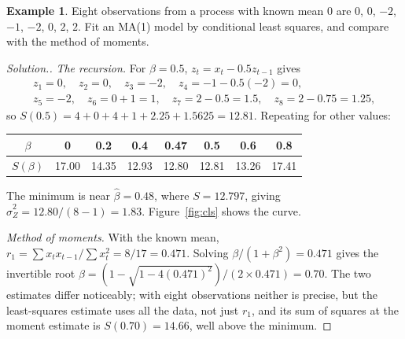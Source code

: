 \documentclass[11pt,a4paper]{article}
\theoremstyle{definition}
\newtheorem{exa}[thm]{Example}
\newenvironment{solution}
  {\renewcommand{\qedsymbol}{}\begin{proof}[\textit{Solution}.]}
  {\end{proof}}
\begin{document}
\begin{exa}\label{exa:fit-ma1}
Eight observations from a process with known mean $0$ are $0$, $0$, $-2$, $-1$, $-2$, $0$, $2$, $2$. Fit an MA(1) model by conditional least
squares, and compare with the method of moments.
\end{exa}

\begin{solution}
\emph{The recursion.} For $\beta = 0.5$, $z_t = x_t - 0.5z_{t-1}$ gives
\begin{gather*}
z_1 = 0 , \quad z_2 = 0 , \quad z_3 = -2 , \quad z_4 = -1 - 0.5(-2) = 0 , \\
z_5 = -2 , \quad z_6 = 0 + 1 = 1 , \quad z_7 = 2 - 0.5 = 1.5 , \quad z_8 = 2 - 0.75 = 1.25 ,
\end{gather*}
so $S(0.5) = 4 + 0 + 4 + 1 + 2.25 + 1.5625 = 12.81$. Repeating for other values:
\begin{center}
\begin{tabular}{c|ccccccc}
$\beta$ & 0 & 0.2 & 0.4 & 0.47 & 0.5 & 0.6 & 0.8 \\
\hline
$S(\beta)$ & 17.00 & 14.35 & 12.93 & 12.80 & 12.81 & 13.26 & 17.41 \\
\end{tabular}
\end{center}
The minimum is near $\hat\beta = 0.48$, where $S = 12.797$, giving $\hat\sigma_Z^2 = 12.80/(8 - 1) = 1.83$. Figure~\ref{fig:cls} shows the curve.

\emph{Method of moments.} With the known mean, $r_1 = \sum x_tx_{t-1}/\sum x_t^2 = 8/17 = 0.471$. Solving $\beta/(1 + \beta^2) = 0.471$ gives the invertible root
$\beta = (1 - \sqrt{1 - 4(0.471)^2})/(2 \times 0.471) = 0.70$. The two estimates differ noticeably; with eight observations neither is precise,
but the least-squares estimate uses all the data, not just $r_1$, and its sum of squares at the moment estimate is
$S(0.70) = 14.66$, well above the minimum.
\end{solution}
\end{document}
